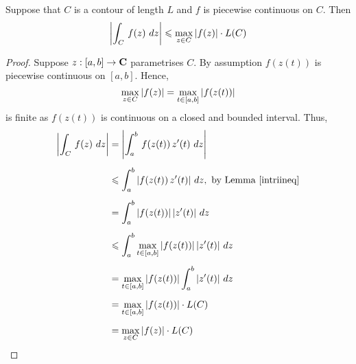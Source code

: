 \begin{theorem}\label{contourtriineq}
Suppose that $C$ is a contour of length $L$ and $f$ is piecewise continuous on $C$. Then
\[\left\lvert\int_C\,f(z)\ dz\right\rvert \leqslant \max_{z \in C}\left\lvert f(z)\right\rvert \cdot L(C)\]
\end{theorem}
\begin{proof}
Suppose $z:[a,b] \to \mathbf C$ parametrises $C$. By assumption $f(z(t))$ is piecewise continuous on $[a,b]$. Hence,
\[\max_{z \in C}\left\lvert f(z)\right\rvert = \max_{t \in [a,b]}\left\lvert f(z(t))\right\rvert\]
is finite as $f(z(t))$ is continuous on a closed and bounded interval. Thus,
\begin{align*}
\abs{\int_C\,f(z)\ dz} &= \abs{\int_a^b\,f(z(t))\,z'(t)\ dz}\\[0.5em]
 &\leq \int_a^b\abs{f(z(t))\,z'(t)}\, dz,\ \text{by Lemma \ref{intriineq}}\\[0.5em]
 &= \int_a^b\abs{f(z(t))}\abs{z'(t)}\, dz\\[0.5em]
 &\leq \int_a^b\max_{t \in [a,b]}\abs{f(z(t))}\abs{z'(t)}\, dz\\[0.5em]
 &= \max_{t \in [a,b]}\abs{f(z(t))}\int_a^b\abs{z'(t)}\, dz\\[0.5em]
 &= \max_{t \in [a,b]}\abs{f(z(t))}\cdot L(C)\\[0.5em]
 &= \max_{z \in C}\abs{f(z)}\cdot L(C)
\end{align*}
\end{proof}

\vspace*{1em}

